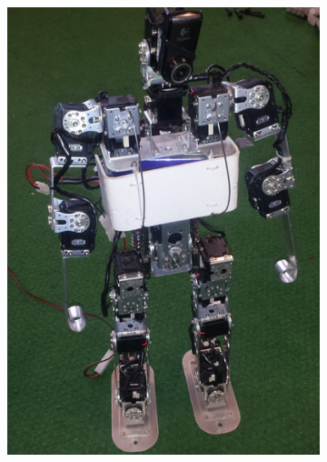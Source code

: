 \begin{figure}[htb]
\begin{subfigure}{0.3\paperwidth}
    \end{subfigure}
    \begin{subfigure}{0.3\paperwidth}
        \centering
        \includegraphics[width=0.84\linewidth]{../media/sigmaban_1_2_crop.jpg}
    \end{subfigure}
    \newline
    \begin{subfigure}{0.3\paperwidth}
        \centering

\end{subfigure}
\end{figure}
